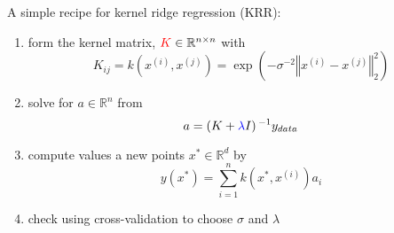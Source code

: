 A simple recipe for {\color{red}kernel} {\color{blue}ridge} regression (KRR):\\
\begin{enumerate}
	\pause{}
	\item form the kernel matrix, $\color{red}K\color{black}\in\mathbb{R}^{n\times n}$ with \[K_{ij}=k(x^{(i)},x^{(j)})= \exp\left(-\sigma^{-2}\left\Vert x^{(i)}-x^{(j)} \right\Vert_2^2 \right)\]	\pause{}
	\item solve for $a\in\mathbb{R}^{n}$ from \[a=\left(K + \color{blue}\lambda\color{black} I\right)^{-1}y_{data}\]	\pause{}
	\item compute values a new points $x^{*}\in \mathbb{R}^{d}$ by\[ y(x^{*})=\sum_{i=1}^{n}k(x^{*},x^{(i)})a_i\]	\pause{}
	\item check using cross-validation to choose $\sigma$ and $\lambda$
\end{enumerate}